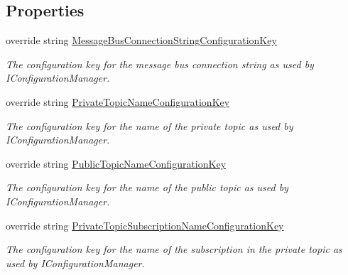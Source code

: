\subsection*{Properties}
\begin{DoxyCompactItemize}
\item 
override string \hyperlink{classCqrs_1_1Azure_1_1ServiceBus_1_1AzureEventBus_a01cf73f187e77b2116e1f7dc68c3e7e6_a01cf73f187e77b2116e1f7dc68c3e7e6}{Message\+Bus\+Connection\+String\+Configuration\+Key}
\begin{DoxyCompactList}\small\item\em The configuration key for the message bus connection string as used by I\+Configuration\+Manager. \end{DoxyCompactList}\item 
override string \hyperlink{classCqrs_1_1Azure_1_1ServiceBus_1_1AzureEventBus_a822a0946e9848950c8be3b8f423fe20a_a822a0946e9848950c8be3b8f423fe20a}{Private\+Topic\+Name\+Configuration\+Key}
\begin{DoxyCompactList}\small\item\em The configuration key for the name of the private topic as used by I\+Configuration\+Manager. \end{DoxyCompactList}\item 
override string \hyperlink{classCqrs_1_1Azure_1_1ServiceBus_1_1AzureEventBus_a8428d6c874f19d4ae0cc42bb6ae3ab6d_a8428d6c874f19d4ae0cc42bb6ae3ab6d}{Public\+Topic\+Name\+Configuration\+Key}
\begin{DoxyCompactList}\small\item\em The configuration key for the name of the public topic as used by I\+Configuration\+Manager. \end{DoxyCompactList}\item 
override string \hyperlink{classCqrs_1_1Azure_1_1ServiceBus_1_1AzureEventBus_a112106688036d18c72fc02875b1b0a8b_a112106688036d18c72fc02875b1b0a8b}{Private\+Topic\+Subscription\+Name\+Configuration\+Key}
\begin{DoxyCompactList}\small\item\em The configuration key for the name of the subscription in the private topic as used by I\+Configuration\+Manager. \end{DoxyCompactList}\item 

\end{DoxyCompactItemize}
